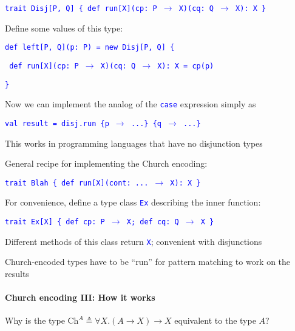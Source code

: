 \texttt{\textcolor{blue}{\footnotesize{}trait Disj{[}P, Q{]} \{ def
run{[}X{]}(cp: P $\rightarrow$ X)(cq: Q $\rightarrow$ X): X \}}}{\footnotesize\par}

Define some values of this type:

\texttt{\textcolor{blue}{\footnotesize{}def left{[}P, Q{]}(p: P) =
new Disj{[}P, Q{]} \{}}{\footnotesize\par}

\texttt{\textcolor{blue}{\footnotesize{} def run{[}X{]}(cp: P $\rightarrow$
X)(cq: Q $\rightarrow$ X): X = cp(p) }}{\footnotesize\par}

\texttt{\textcolor{blue}{\footnotesize{}\}}}{\footnotesize\par}

Now we can implement the analog of the \texttt{\textcolor{blue}{\footnotesize{}case}}
expression simply as

\texttt{\textcolor{blue}{\footnotesize{}val result = disj.run \{p
$\rightarrow$ ...\} \{q $\rightarrow$ ...\}}}{\footnotesize\par}

This works in programming languages that have no disjunction types

General recipe for implementing the Church encoding: 

\texttt{\textcolor{blue}{\footnotesize{}trait Blah \{ def run{[}X{]}(cont: ... $\rightarrow$
X): X \}}}{\footnotesize\par}

For convenience, define a type class \texttt{\textcolor{blue}{\footnotesize{}Ex}}
describing the inner function:

\texttt{\textcolor{blue}{\footnotesize{}trait Ex{[}X{]} \{ def cp: P
$\rightarrow$ X; def cq: Q $\rightarrow$ X \}}}{\footnotesize\par}

Different methods of this class return \texttt{\textcolor{blue}{\footnotesize{}X}};
convenient with disjunctions

Church-encoded types have to be \textsf{``}run\textsf{''} for pattern matching to
work on the results


\paragraph{Church encoding III: How it works}

Why is the type $\text{Ch}^{A}\triangleq\forall X.\left(A\rightarrow X\right)\rightarrow X$
equivalent to the type $A$?


